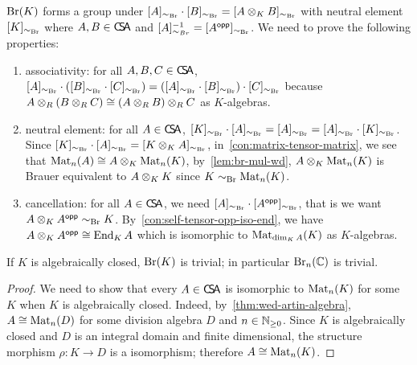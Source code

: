 \begin{construction}\label{con:br}
  $\operatorname{Br}(K)$ forms a group under $[A]_{\sim_{\operatorname{Br}}}\cdot[B]_{\sim_{\operatorname{Br}}}=[A\otimes_{K}B]_{\sim_{\operatorname{Br}}}$ with neutral element $[K]_{\sim_{\operatorname{Br}}}$ where $A, B\in\operatorname{\mathsf{C}\!\mathsf{S}\!\mathsf{A}}$ and $[A]_{\sim_{Br}}^{-1}=[A^{\mathsf{opp}}]_{\sim_{\operatorname{Br}}}$. We need to prove the following properties:
  \begin{enumerate}
    \item associativity: for all $A, B, C\in\operatorname{\mathsf{C}\!\mathsf{S}\!\mathsf{A}}$, $[A]_{\sim_{\operatorname{Br}}}\cdot\left([B]_{\sim_{\operatorname{Br}}}\cdot[C]_{\sim_{\operatorname{Br}}}\right)=\left([A]_{\sim_{\operatorname{Br}}}\cdot[B]_{\sim_{\operatorname{Br}}}\right)\cdot [C]_{\sim_{\operatorname{Br}}}$ because $A\otimes_{R}\left(B\otimes_{R}C\right)\cong \left(A\otimes_{R}B\right)\otimes_{R}C$ as $K$-algebras.
    \item neutral element: for all $A\in \operatorname{\mathsf{C}\!\mathsf{S}\!\mathsf{A}}$, $[K]_{\sim_{\operatorname{Br}}}\cdot[A]_{\sim_{\operatorname{Br}}}=[A]_{\sim_{\operatorname{Br}}}=[A]_{\sim_{\operatorname{Br}}}\cdot [K]_{\sim_{\operatorname{Br}}}$. Since $[K]_{\sim_{\operatorname{Br}}}\cdot[A]_{\sim_{\operatorname{Br}}}=[K\otimes_{K} A]_{\sim_{\operatorname{Br}}}$, in~\cref{con:matrix-tensor-matrix}, we see that $\operatorname{Mat}_{n}(A)\cong A\otimes_{K}\operatorname{Mat}_{n}(K)$, by~\cref{lem:br-mul-wd}, $A\otimes_{K}\operatorname{Mat}_{n}(K)$ is Brauer equivalent to $A\otimes_{K} K$ since $K\sim_{\operatorname{Br}}\operatorname{Mat}_{n}(K)$.
    \item cancellation: for all $A \in \operatorname{\mathsf{C}\!\mathsf{S}\!\mathsf{A}}$, we need $[A]_{\sim_{\operatorname{Br}}}\cdot[A^{\mathsf{opp}}]_{\sim_{\operatorname{Br}}}$, that is we want $A\otimes_{K}A^{\mathsf{opp}}\sim_{\operatorname{Br}} K$. By~\cref{con:self-tensor-opp-iso-end}, we have $A\otimes_{K}A^{\mathsf{opp}}\cong \operatorname{End}_{K}A$ which is isomorphic to $\operatorname{Mat}_{\dim_{K}A}(K)$ as $K$-algebras.
  \end{enumerate}
  \leanok
\end{construction}

\begin{theorem}
  \label{thm:br-triv-alg-closed}
  If $K$ is algebraically closed, $\operatorname{Br}(K)$ is trivial; in particular $\operatorname{Br}_{n}(\mathbb{C})$ is trivial.
  \leanok
\end{theorem}
\begin{proof}
  We need to show that every $A\in\operatorname{\mathsf{C}\!\mathsf{S}\!\mathsf{A}}$ is isomorphic to $\operatorname{Mat}_{n}(K)$ for some $K$ when $K$ is algebraically closed. Indeed, by~\cref{thm:wed-artin-algebra}, $A \cong \operatorname{Mat}_{n}(D)$ for some division algebra $D$ and $n\in\mathbb{N}_{\ge0}$. Since $K$ is algebraically closed and $D$ is an integral domain and finite dimensional, the structure morphism $\rho: K\to D$ is a isomorphism; therefore $A\cong \operatorname{Mat}_{n}(K)$.
\end{proof}

